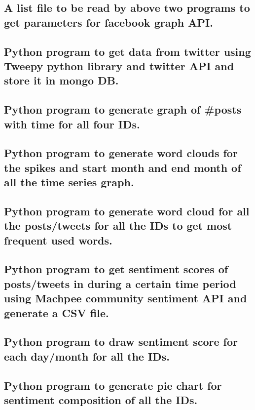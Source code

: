 \documentclass[paper=a4, fontsize=11pt]{scrartcl} %
\numberwithin{equation}{section} %
\numberwithin{figure}{section} %
\numberwithin{table}{section} %
\begin{document}
\subsection{A list file to be read by above two programs to get parameters for facebook graph API.}

\newpage
\subsection{Python program to get data from twitter using Tweepy python library and twitter API and store it in mongo DB.}

\newpage
\subsection{Python program to generate graph of \#posts with time for all four IDs.}

\newpage
\subsection{Python program to generate word clouds for the spikes and start month and end month of all the time series graph.}

\newpage
\subsection{Python program to generate word cloud for all the posts/tweets for all the IDs to get most frequent used words.}

\newpage
\subsection{Python program to get sentiment scores of posts/tweets in during a certain time period using Machpee community sentiment API and generate a CSV file.}

\newpage
\subsection{Python program to draw sentiment score for each day/month for all the IDs.}

\newpage
\subsection{Python program to generate pie chart for sentiment composition of all the IDs.}

\end{document}
